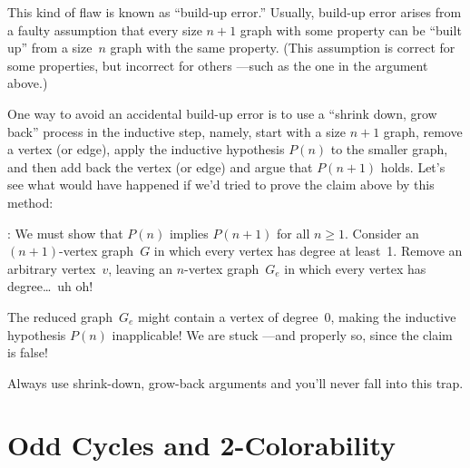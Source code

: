 This kind of flaw is known as ``build-up error.''  Usually, build-up
error arises from a faulty assumption that every size $n + 1$ graph
with some property can be ``built up'' from a size~$n$ graph with the
same property.  (This assumption is correct for some properties, but
incorrect for others ---such as the one in the argument above.)

One way to avoid an accidental build-up error is to use a ``shrink
down, grow back'' process in the inductive step, namely, start with a
size $n+1$ graph, remove a vertex (or edge), apply the inductive
hypothesis $P(n)$ to the smaller graph, and then add back the vertex
(or edge) and argue that $P(n + 1)$ holds.  Let's see what would have
happened if we'd tried to prove the claim above by this method:

: We must show that $P(n)$
implies $P(n + 1)$ for all $n \ge 1$.  Consider an $(n + 1)$-vertex
graph~$G$ in which every vertex has degree at least~1.  Remove an
arbitrary vertex~$v$, leaving an $n$-vertex graph~$G_e$ in which every
vertex has degree\dots\ uh oh!

The reduced graph~$G_e$ might contain a vertex of degree~0, making the
inductive hypothesis $P(n)$ inapplicable!  We are stuck ---and
properly so, since the claim is false!

Always use shrink-down, grow-back arguments and you'll never fall into
this trap.


\fi

\begin{problems}
\classproblems
{}

\homeworkproblems
{}


\homeworkproblems
{}

\examproblems
{}

\end{problems}

\section{Odd Cycles and 2-Colorability}\label{subsec:odd_cycles}

